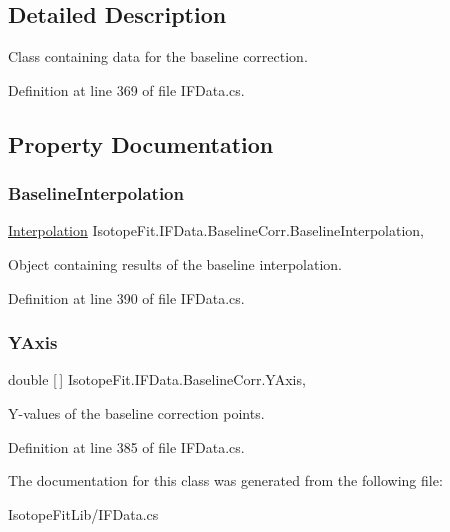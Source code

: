 \subsection{Detailed Description}
Class containing data for the baseline correction. 



Definition at line 369 of file I\+F\+Data.\+cs.



\subsection{Property Documentation}
\mbox{\label{class_isotope_fit_1_1_i_f_data_1_1_baseline_corr_a914a7b2ac945482a7c73874fbff45951}} 
\subsubsection{\texorpdfstring{Baseline\+Interpolation}{BaselineInterpolation}}
{\footnotesize\ttfamily \hyperlink{class_isotope_fit_1_1_interpolation}{Interpolation} Isotope\+Fit.\+I\+F\+Data.\+Baseline\+Corr.\+Baseline\+Interpolation\hspace{0.3cm}{\ttfamily [get]}, {\ttfamily [set]}}



Object containing results of the baseline interpolation. 



Definition at line 390 of file I\+F\+Data.\+cs.

\mbox{\label{class_isotope_fit_1_1_i_f_data_1_1_baseline_corr_aa71067f79827da27836daa705413133c}} 
\subsubsection{\texorpdfstring{Y\+Axis}{YAxis}}
{\footnotesize\ttfamily double \mbox{[}$\,$\mbox{]} Isotope\+Fit.\+I\+F\+Data.\+Baseline\+Corr.\+Y\+Axis\hspace{0.3cm}{\ttfamily [get]}, {\ttfamily [set]}}



Y-\/values of the baseline correction points. 



Definition at line 385 of file I\+F\+Data.\+cs.



The documentation for this class was generated from the following file\+:\begin{DoxyCompactItemize}
\item 
Isotope\+Fit\+Lib/I\+F\+Data.\+cs\end{DoxyCompactItemize}
